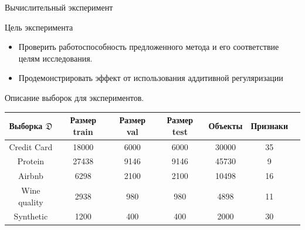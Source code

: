 \documentclass[9pt,pdf,hyperref={unicode}]{beamer}
\begin{document}
\begin{frame}{Вычислительный эксперимент}
\begin{block}{Цель эксперимента}
    \begin{itemize}
        \item Проверить работоспособность предложенного метода и его соответствие целям исследования.
        \item Продемонстрировать эффект от использования аддитивной регуляризации
    \end{itemize}
\end{block}
\begin{center}
   Описание выборок для экспериментов.
\end{center}
\begin{table}[!htbp]
\captionsetup{justification=raggedright,singlelinecheck=false}
\label{table1}

\footnotesize
\begin{center}
\centering
\begin{tabular}{ | c | c | c |c | c | c | c | }
\hline
Выборка $\mathfrak{D}$ & Размер train  & Размер val  & Размер test& Объекты & Признаки\\
\hline
Credit Card & 18000 & 6000& 6000 & 30000 & 35  \\
\hline
Protein & 27438 & 9146 & 9146 & 45730 & 9 \\
\hline
Airbnb & 6298 & 2100 & 2100 & 10498 & 16 \\
\hline
Wine quality & 2938 & 980 & 980 & 4898 & 11 \\
\hline
Synthetic & 1200 & 400 & 400 & 2000 & 30 \\
\hline
\end{tabular}
\end{center}
\end{table}

\end{frame}
\end{document}
